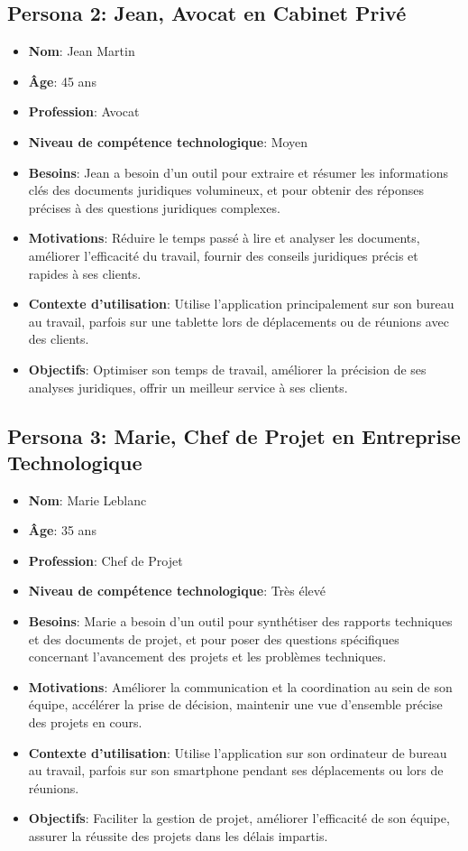 \documentclass{article}
\begin{document}
\subsection*{Persona 2: Jean, Avocat en Cabinet Privé}
\begin{itemize}
    \item \textbf{Nom}: Jean Martin
    \item \textbf{Âge}: 45 ans
    \item \textbf{Profession}: Avocat
    \item \textbf{Niveau de compétence technologique}: Moyen
    \item \textbf{Besoins}: Jean a besoin d'un outil pour extraire et résumer les informations clés des documents juridiques volumineux, et pour obtenir des réponses précises à des questions juridiques complexes.
    \item \textbf{Motivations}: Réduire le temps passé à lire et analyser les documents, améliorer l'efficacité du travail, fournir des conseils juridiques précis et rapides à ses clients.
    \item \textbf{Contexte d'utilisation}: Utilise l'application principalement sur son bureau au travail, parfois sur une tablette lors de déplacements ou de réunions avec des clients.
    \item \textbf{Objectifs}: Optimiser son temps de travail, améliorer la précision de ses analyses juridiques, offrir un meilleur service à ses clients.
\end{itemize}

\subsection*{Persona 3: Marie, Chef de Projet en Entreprise Technologique}
\begin{itemize}
    \item \textbf{Nom}: Marie Leblanc
    \item \textbf{Âge}: 35 ans
    \item \textbf{Profession}: Chef de Projet
    \item \textbf{Niveau de compétence technologique}: Très élevé
    \item \textbf{Besoins}: Marie a besoin d'un outil pour synthétiser des rapports techniques et des documents de projet, et pour poser des questions spécifiques concernant l'avancement des projets et les problèmes techniques.
    \item \textbf{Motivations}: Améliorer la communication et la coordination au sein de son équipe, accélérer la prise de décision, maintenir une vue d'ensemble précise des projets en cours.
    \item \textbf{Contexte d'utilisation}: Utilise l'application sur son ordinateur de bureau au travail, parfois sur son smartphone pendant ses déplacements ou lors de réunions.
    \item \textbf{Objectifs}: Faciliter la gestion de projet, améliorer l'efficacité de son équipe, assurer la réussite des projets dans les délais impartis.
\end{itemize}
\end{document}
